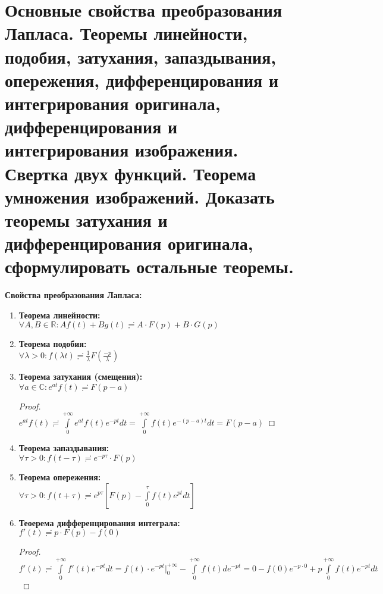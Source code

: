 \newpage
\section{Основные свойства преобразования Лапласа. Теоремы линейности, подобия, затухания, запаздывания, опережения, дифференцирования и интегрирования оригинала, дифференцирования и интегрирования изображения. Свертка двух функций. Теорема умножения изображений. Доказать теоремы затухания и дифференцирования оригинала, сформулировать остальные теоремы.}

\textbf{Свойства преобразования Лапласа:}

\begin{enumerate}
    \item \textbf{Теорема линейности:}\\
    $\forall A, B \in \mathbb{R}: Af(t)+Bg(t)\risingdotseq A\cdot F(p)+B\cdot G(p)$
    \item \textbf{Теорема подобия:}\\
    $\forall \lambda > 0: f(\lambda t) \risingdotseq \frac{1}{\lambda} F\left(\frac{-p}{\lambda}\right)$
    \item \textbf{Теорема затухания (смещения):}\\
    $\forall a \in \mathbb{C}: e^{at}f(t)\risingdotseq F(p-a)$\\
    \begin{proof}
        \ \\
        $e^{at}f(t)\risingdotseq \int\limits_0^{+\infty} e^{at}f(t)e^{-pt}dt=\int\limits_0^{+\infty}f(t)e^{-(p-a)t}dt=F(p-a)$
    \end{proof}
    \item \textbf{Теорема запаздывания:}\\
    $\forall \tau > 0: f(t-\tau) \risingdotseq e^{-p\tau}\cdot F(p)$
    \item \textbf{Теорема опережения:}\\
    $\forall \tau > 0: f(t+\tau) \risingdotseq e^{p\tau}\left[F(p)-\int\limits_0^{\tau}f(t)e^{pt}dt\right]$
    \item \textbf{Теоерема дифференцирования интеграла:}\\
    $f'(t)\risingdotseq p\cdot F(p) -f(0)$
    \begin{proof}
        \ \\
        $f'(t)\risingdotseq \int\limits_0^{+\infty}f'(t)e^{-pt}dt = f(t)\cdot e^{-pt}\bigg|_0^{+\infty} -\int\limits_0^{+\infty} f(t) de^{-pt} = 0 -f(0)e^{-p\cdot 0}+p\int\limits_0^{+\infty}f(t)e^{-pt}dt$\\

\end{proof}
\end{enumerate}
